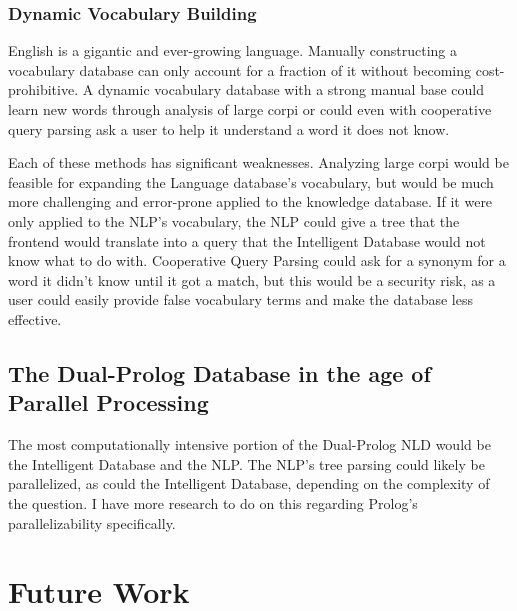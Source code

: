 \documentclass[12pt]{article}
\begin{document}
\subsubsection*{Dynamic Vocabulary Building}

English is a gigantic and ever-growing language. Manually constructing a vocabulary database can only account for a fraction of it without becoming cost-prohibitive. A dynamic vocabulary database with a strong manual base could learn new words through analysis of large corpi or could even with cooperative query parsing ask a user to help it understand a word it does not know.

Each of these methods has significant weaknesses. Analyzing large corpi would be feasible for expanding the Language database's vocabulary, but would be much more challenging and error-prone applied to the knowledge database. If it were only applied to the NLP's vocabulary, the NLP could give a tree that the frontend would translate into a query that the Intelligent Database would not know what to do with. Cooperative Query Parsing could ask for a synonym for a word it didn't know until it got a match, but this would be a security risk, as a user could easily provide false vocabulary terms and make the database less effective.

\subsection*{The Dual-Prolog Database in the age of Parallel Processing}

The most computationally intensive portion of the Dual-Prolog NLD would be the Intelligent Database and the NLP. The NLP's tree parsing could likely be parallelized, as could the Intelligent Database, depending on the complexity of the question. I have more research to do on this regarding Prolog's parallelizability specifically.  

\section*{Future Work}

\singlespacing
{}

\end{document}
